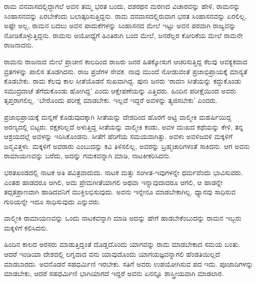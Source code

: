 ರಾಮ ವನವಾಸದಲ್ಲಿದ್ದಾಗಲೆ ಅವನ ತಮ್ಮ ಭರತ ಬಂದು, ದಶರಥನ ಮರಣದ ವಿಚಾರವನ್ನು ಹೇಳಿ, ರಾಮನನ್ನು ಸಿಂಹಾಸನವನ್ನು ಏರಬೇಕೆಂದು ಬಲಾತ್ಕರಿಸುತ್ತಿದ್ದನು. ರಾಮ ವನವಾಸದಲ್ಲಿರುವಾಗ ಭರತ ಸಿಂಹಾಸನವನ್ನು ಏರಲಿಲ್ಲ. ಅಷ್ಟೇ ಅಲ್ಲ, ರಾಮನ ಬದಲು ಅವನ ಪಾದುಕೆಗಳನ್ನು ಸಿಂಹಾಸನದ ಮೇಲೆ ಇಟ್ಟು ಅವನ ಪರವಾಗಿ ರಾಜ್ಯವನ್ನು ನೋಡಿಕೊಳ್ಳುತ್ತಿದ್ದನು. ರಾಮನು ಅಯೋಧ್ಯೆಗೆ ಹಿಂತಿರುಗಿ ಬಂದ ಮೇಲೆ, ಜನರೆಲ್ಲರ ಕೋರಿಕೆಯ ಮೇಲೆ ರಾಮನೇ ರಾಜನಾದನು.

ರಾಮನು ರಾಜನಾದ ಮೇಲೆ ಪ್ರಾಚೀನ ಕಾಲದಿಂದ ರಾಜರು ಜನರ ಹಿತಕ್ಕೋಸುಗ ಆಚರಿಸುತ್ತಿದ್ದ ಕೆಲವು ಆವಕ್ಯಕವಾದ ವ್ರತಗಳನ್ನು ಪಾಲಿಸ ತೊಡಗಿದನು. ರಾಜ ಪ್ರಜೆಗಳ ಸೇವಕ. ನಾವು ಮುಂದೆ ನೋಡುವಂತೆ ಪ್ರಜಾಭಿಪ್ರಾಯಕ್ಕೆ ಮಾನ್ಯತೆ ಕೊಡಬೇಕು. ರಾಮ ಕೆಲವು ಕಾಲ ಸೀತೆಯೊಡನೆ ಸುಖವಾಗಿದ್ದ. ಪುನಃ ಜನರು ‘ರಾವಣ ಸೀತೆಯನ್ನು ಕದ್ದುಕೊಂಡು ಸಮುದ್ರದಾಚೆ ತೆಗೆದುಕೊಂಡು ಹೋಗಿದ್ದ’ ಎಂದು ಆಕ್ಷೇಪಣೆಯನ್ನು ಎತ್ತಿದರು. ಹಿಂದಿನ ಪರೀಕ್ಷೆಯಿಂದ ಅವರು ತೃಪ್ತರಾಗಲಿಲ್ಲ. ‘ಬೇರೊಂದು ಪರೀಕ್ಷೆ ಮಾಡಬೇಕು. ಇಲ್ಲದೆ ಇದ್ದರೆ ಅವಳನ್ನು ತ್ಯಜಿಸಬೇಕು’ ಎಂದರು.

ಪ್ರಜಾಭಿಪ್ರಾಯಕ್ಕೆ ಮನ್ನಣೆ ಕೊಡುವುದಕ್ಕಾಗಿ ಸೀತೆಯನ್ನು ದೇಶದಿಂದ ಹೊರಗೆ ಅಟ್ಟಿ ವಾಲ್ಮೀಕಿ ಮಹರ್ಷಿಯಿದ್ದ ಅರಣ್ಯದಲ್ಲಿ ಬಿಟ್ಟರು. ರಕ್ಷಕರಿಲ್ಲದೆ ಅಳುತ್ತಿದ್ದ ಸೀತೆಯನ್ನು ವಾಲ್ಮೀಕಿ ಕಂಡು, ಅವಳ ದುಃಖದ ಕಥೆಯನ್ನು ಕೇಳಿ, ತನ್ನ ಆಶ್ರಯದಲ್ಲೆ ಅವಳನ್ನು ಇರಿಸಿಕೊಂಡನು. ಸೀತೆಗೆ ಹೆರಿಗೆಯ ಸಮಯವಾಗಿತ್ತು. ಅವಳು ಅವಳಿಜವಳಿ ಮಕ್ಕಳಿಗೆ ಜನ್ಮವಿತ್ತಳು. ಮಕ್ಕಳಿಗೆ ಅವರಾರು ಎಂಬುದನ್ನು ಕವಿ ತಿಳಿಸಲಿಲ್ಲ, ಅವರನ್ನು ಬ್ರಹ್ಮಚಾರಿಗಳಂತೆ ಸಾಕಿದನು. ಆಗ ಅವನು ರಾಮಾಯಣವನ್ನು ಬರೆದು, ಅದನ್ನು ಗಮಕವನ್ನಾಗಿ ಮಾಡಿ, ನಾಟಕೀಕರಿಸಿದನು.

ಭರತಖಂಡದಲ್ಲಿ ನಾಟಕ ಅತಿ ಪವಿತ್ರವಾದುದು. ನಾಟಕ ಮತ್ತು ಸಂಗೀತ-ಇವುಗಳನ್ನೇ ಧರ್ಮವೆಂದು ಭಾವಿಸುವರು. ಎಂತಹ ಹಾಡದರೂ ಆಗಿಲಿ, ಅದು ಪ್ರೇಮಗೀತೆಯಾಗಲಿ ಅಥವಾ ಇನ್ನಾವುದಾದರೂ ಆಗಲಿ, ಆ ಹಾಡನ್ನೇ ತದ್ಗತಪ್ರಾಣವಾಗಿ ಹಾಡಿದವನಿಗೆ ಮುಕ್ತಿಲಭಿಸುವುದು. ಅವನು ಇನ್ನೇನೂ ಮಾಡಬೇಕಾಗಿಲ್ಲ. ಧ್ಯಾನವು ಸಾಧಿಸುವ ಗುರಿಯನ್ನೇ ಇದೂ ಸಾಧಿಸುವುದು ಎನ್ನುವರು.

ವಾಲ್ಮೀಕಿ ರಾಮಾಯಣವನ್ನು ಒಂದು ನಾಟಕವನ್ನಾಗಿ ಮಾಡಿ ಅದನ್ನು ಹೇಗೆ ಹಾಡಬೇಕೆಂಬುದನ್ನು ರಾಮನ ಇಬ್ಬರು ಮಕ್ಕಳಿಗೆ ಕಲಿಸಿದನು.

ಹಿಂದಿನ ಕಾಲದ ಅರಸರು ಮಾಡುತ್ತಿದ್ದಂತೆ ದೊಡ್ಡದೊಂದು ಯಾಗವನ್ನು ರಾಮ ಮಾಡಬೇಕಾದ ಸಮಯ ಬಂತು. ಆದರೆ ಇಂಡಿಯಾ ದೇಶದಲ್ಲಿ ಲಗ್ನವಾದ ವನು ಯಾವುದೊಂದು ಯಾಗಯಜ್ಞವನ್ನಾಗಲಿ ಹೆಂಡತಿಯಿಲ್ಲದೆ ಮಾಡಬಾರದು. ಅವನೊಡನೆ ಸಹಧರ್ಮಿಣಿ ಇರಬೇಕು. ಸತಿಗೆ ಅವರು ಉಪಯೋಗಿಸುವ ಪದ ಇದು. ಪೂಜಾದಿಗಳನ್ನು ಮಾಡಬೇಕು, ಆದರೆ ಸಹಧರ್ಮಿಣಿ ಭಾಗಿಯಾಗದೆ ಇದ್ದರೆ ಅವನು ಏನನ್ನೂ ಶಾಸ್ತ್ರೀಯವಾಗಿ ಮಾಡಲಾರ.

